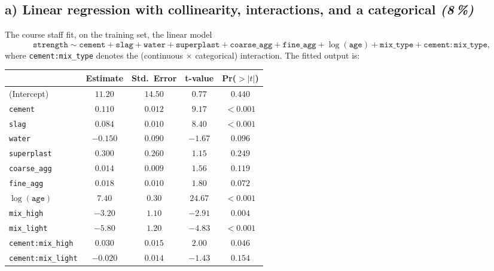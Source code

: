 \documentclass[11pt,a4paper]{article}
\newcommand{\subpoints}[1]{\textit{(#1\,\%)}}
\begin{document}
\subsection*{a) Linear regression with collinearity, interactions, and a categorical \subpoints{8}}

The course staff fit, on the training set, the linear model
$$\texttt{strength} \sim \texttt{cement} + \texttt{slag} + \texttt{water} + \texttt{superplast} + \texttt{coarse\_agg} + \texttt{fine\_agg} + \log(\texttt{age}) + \texttt{mix\_type} + \texttt{cement}\!:\!\texttt{mix\_type},$$
where \texttt{cement:mix\_type} denotes the (continuous $\times$ categorical) interaction. The fitted output is:

\begin{center}\small
\begin{tabular}{lcccc}
\toprule
 & \textbf{Estimate} & \textbf{Std.\ Error} & \textbf{t-value} & \textbf{Pr($>|t|$)} \\
\midrule
(Intercept)                       & $11.20$  & $14.50$ & $0.77$   & $0.440$  \\
\texttt{cement}                   & $0.110$  & $0.012$ & $9.17$   & $<0.001$ \\
\texttt{slag}                     & $0.084$  & $0.010$ & $8.40$   & $<0.001$ \\
\texttt{water}                    & $-0.150$ & $0.090$ & $-1.67$  & $0.096$  \\
\texttt{superplast}               & $0.300$  & $0.260$ & $1.15$   & $0.249$  \\
\texttt{coarse\_agg}              & $0.014$  & $0.009$ & $1.56$   & $0.119$  \\
\texttt{fine\_agg}                & $0.018$  & $0.010$ & $1.80$   & $0.072$  \\
$\log(\texttt{age})$              & $7.40$   & $0.30$  & $24.67$  & $<0.001$ \\
\texttt{mix\_high}                & $-3.20$  & $1.10$  & $-2.91$  & $0.004$  \\
\texttt{mix\_light}               & $-5.80$  & $1.20$  & $-4.83$  & $<0.001$ \\
\texttt{cement:mix\_high}         & $0.030$  & $0.015$ & $2.00$   & $0.046$  \\
\texttt{cement:mix\_light}        & $-0.020$ & $0.014$ & $-1.43$  & $0.154$  \\
\bottomrule
\end{tabular}
\end{center}
\end{document}
